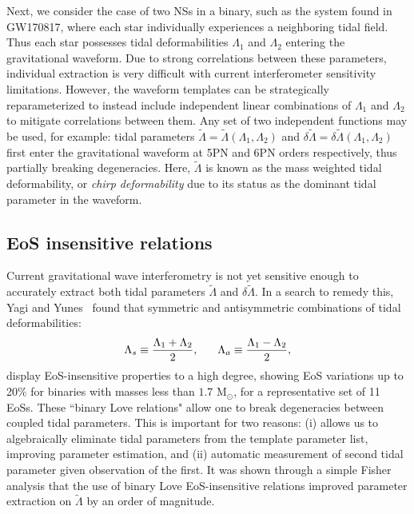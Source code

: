\documentclass[prd,twocolumn,nofootinbib,superscriptaddress,amsmath,amssymb]{revtex4-1}
\begin{document}
Next, we consider the case of two NSs in a binary, such as the system found in GW170817, where each star 
individually experiences a neighboring tidal field.
Thus each star possesses tidal deformabilities $\Lambda_1$ and $\Lambda_2$ entering the gravitational waveform.
Due to strong correlations between these parameters, individual extraction is very difficult with current interferometer sensitivity limitations.
However, the waveform templates can be strategically reparameterized to instead include independent linear combinations of $\Lambda_1$ and $\Lambda_2$ to mitigate correlations between them. 
Any set of two independent functions may be used, for example: tidal parameters $\tilde{\Lambda}=\tilde{\Lambda}(\Lambda_1,\Lambda_2)$ and $\delta \tilde{\Lambda}=\delta \tilde{\Lambda}(\Lambda_1,\Lambda_2)$~\cite{Wade:tidalCorrections} first enter the gravitational waveform at 5PN and 6PN orders respectively, thus partially breaking degeneracies.
Here, $\tilde{\Lambda}$ is known as the mass weighted tidal deformability, or \emph{chirp deformability} due to its status as the dominant tidal parameter in the waveform. 

\subsection{EoS insensitive relations}\label{sec:eosInsensitive}
Current gravitational wave interferometry is not yet sensitive enough to accurately extract both tidal parameters $\tilde{\Lambda}$ and $\delta\tilde{\Lambda}$.
In a search to remedy this, Yagi and Yunes~\cite{Yagi:binLove} found that symmetric and antisymmetric combinations of tidal deformabilities:
\begin{equation}
\Lambda_s \equiv \frac{\Lambda_1 + \Lambda_2}{2}, \hspace{6mm} \Lambda_a \equiv \frac{\Lambda_1 - \Lambda_2}{2},
\end{equation}
display EoS-insensitive properties to a high degree, showing EoS variations up to 20\% for binaries with masses less than $1.7 \text{ M}_{\odot}$, for a representative set of 11 EoSs. 
These ``binary Love relations" allow one to break degeneracies between coupled tidal parameters.
This is important for two reasons: (i) allows us to algebraically eliminate tidal parameters from the template parameter list, improving parameter estimation, and (ii) automatic measurement of second tidal parameter given observation of the first.
It was shown through a simple Fisher analysis that the use of binary Love EoS-insensitive relations improved parameter extraction on $\tilde{\Lambda}$ by an order of magnitude.
\end{document}
